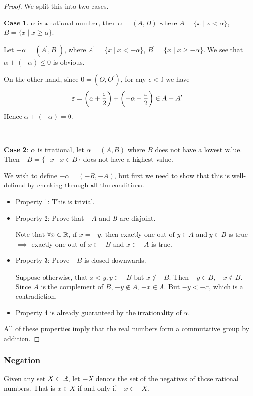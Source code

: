 \begin{proof}
We split this into two cases.

\textbf{Case 1}: $\alpha$ is a rational number, then $\alpha=(A,B)$ where $A = \{x \mid x < \alpha\}$, $B = \{x \mid x \ge \alpha\}$.

Let $-\alpha=(A^\prime,B^\prime)$, where $A^\prime = \{x \mid x < -\alpha\}$, $B^\prime = \{x \mid x\ge -\alpha\}$. 
We see that $\alpha+(-\alpha) \le 0$ is obvious.

On the other hand, since $0=(O,O^\prime)$, for any $\epsilon<0$ we have
\[ \varepsilon = \left(\alpha+\frac{\varepsilon}{2}\right) + \left(-\alpha+\frac{\varepsilon}{2}\right) \in A+A^\prime \]
Hence $\alpha+(-\alpha)=0$.

\

\textbf{Case 2}: $\alpha$ is irrational, let $\alpha = (A,B)$ where $B$ does not have a lowest value. 
Then $-B = \{-x \mid x \in B\}$ does not have a highest value.

We wish to define $-\alpha=(-B,-A)$, but first we need to show that this is well-defined by checking through all the conditions.

\begin{itemize}
\item Property 1: This is trivial.

\item Property 2: Prove that $- A$ and $B$ are disjoint.

Note that $\forall x \in \mathbb R$, if $x=-y$, then exactly one out of $y \in A$ and $y \in B$ is true $\implies$ exactly one out of $x \in -B$ and $x \in -A$ is true.

\item Property 3: Prove $-B$ is closed downwards.

Suppose otherwise, that $x<y, y \in -B$ but $x \notin -B$. Then $-y \in B$, $-x \notin B$. Since $A$ is the complement of $B$, $-y \notin A$, $-x \in A$. But $-y<-x$, which is a contradiction.

\item Property 4 is already guaranteed by the irrationality of $\alpha$.
\end{itemize}

All of these properties imply that the real numbers form a commutative group by addition.
\end{proof}

\subsubsection{Negation}
Given any set $X \subset \mathbb R$, let $-X$ denote the set of the negatives of those rational numbers. That is $x \in X$ if and only if $-x \in -X$. 

